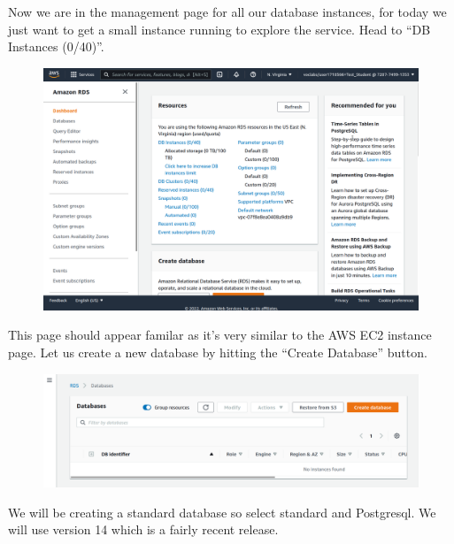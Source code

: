 \documentclass{csse4400}
\begin{document}
Now we are in the management page for all our database instances,
for today we just want to get a small instance running to explore the service.
Head to ``DB Instances (0/40)''.

\begin{figure}[H]
\includegraphics[width=\textwidth]{images/aws_2}
\end{figure}

This page should appear familar as it's very similar to the AWS EC2 instance page.
Let us create a new database by hitting the ``Create Database'' button.

\begin{figure}[H]
\includegraphics[width=\textwidth]{images/aws_3}
\end{figure}



We will be creating a standard database so select standard and Postgresql.
We will use version 14 which is a fairly recent release.
\end{document}
